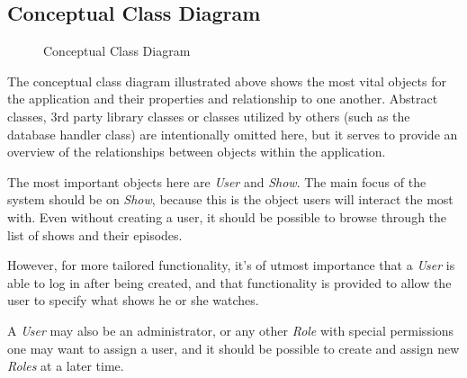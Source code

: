 \subsection{Conceptual Class Diagram}
\newpage
\vspace*{-2.8in}
\begin{figure}[H]
\hspace*{-1.2in}
\caption{Conceptual Class Diagram}
\end{figure}

The conceptual class diagram illustrated above shows the most vital objects for the application and their properties and relationship to one another. Abstract classes, 3rd party library classes or classes utilized by others (such as the database handler class) are intentionally omitted here, but it serves to provide an overview of the relationships between objects within the application.

The most important objects here are \textit{User} and \textit{Show}. The main focus of the system should be on \textit{Show}, because this is the object users will interact the most with. Even without creating a user, it should be possible to browse through the list of shows and their episodes.

However, for more tailored functionality, it's of utmost importance that a \textit{User} is able to log in after being created, and that functionality is provided to allow the user to specify what shows he or she watches.

A \textit{User} may also be an administrator, or any other \textit{Role} with special permissions one may want to assign a user, and it should be possible to create and assign new \textit{Roles} at a later time.

